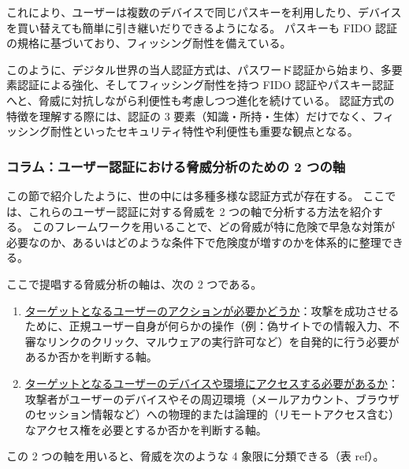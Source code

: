 \documentclass[uplatex]{jsarticle}
\def\ref#1{ref}%
\def\label#1{}%
\begin{document}
これにより、ユーザーは複数のデバイスで同じパスキーを利用したり、デバイスを買い替えても簡単に引き継いだりできるようになる。
パスキーも FIDO 認証の規格に基づいており、フィッシング耐性を備えている。

このように、デジタル世界の当人認証方式は、パスワード認証から始まり、多要素認証による強化、そしてフィッシング耐性を持つ FIDO 認証やパスキー認証へと、脅威に対抗しながら利便性も考慮しつつ進化を続けている。
認証方式の特徴を理解する際には、認証の 3 要素（知識・所持・生体）だけでなく、フィッシング耐性といったセキュリティ特性や利便性も重要な観点となる。

\subsubsection{コラム：ユーザー認証における脅威分析のための 2 つの軸}

この節で紹介したように、世の中には多種多様な認証方式が存在する。
ここでは、これらのユーザー認証に対する脅威を 2 つの軸で分析する方法を紹介する。
このフレームワークを用いることで、どの脅威が特に危険で早急な対策が必要なのか、あるいはどのような条件下で危険度が増すのかを体系的に整理できる。

\begin{dfn}\label{dfn:ch2-threat-axes}
ここで提唱する脅威分析の軸は、次の 2 つである。
\begin{enumerate}
\item \underline{ターゲットとなるユーザーのアクションが必要かどうか}：攻撃を成功させるために、正規ユーザー自身が何らかの操作（例：偽サイトでの情報入力、不審なリンクのクリック、マルウェアの実行許可など）を自発的に行う必要があるか否かを判断する軸。
\item \underline{ターゲットとなるユーザーのデバイスや環境にアクセスする必要があるか}：攻撃者がユーザーのデバイスやその周辺環境（メールアカウント、ブラウザのセッション情報など）への物理的または論理的（リモートアクセス含む）なアクセス権を必要とするか否かを判断する軸。
\end{enumerate}
\end{dfn}

この 2 つの軸を用いると、脅威を次のような 4 象限に分類できる（表 \ref{tab:ch2-threat-quadrants}）。
\end{document}
